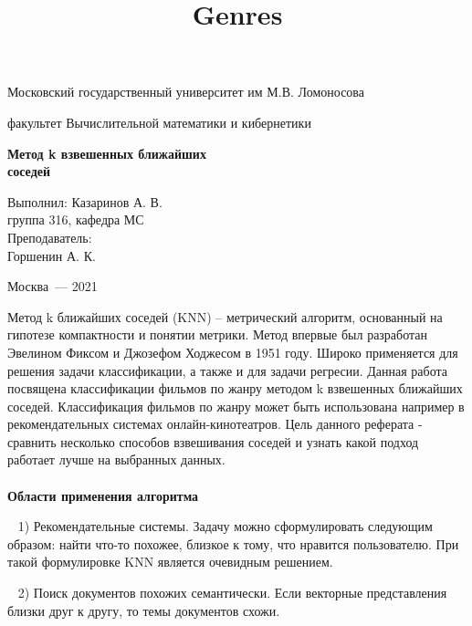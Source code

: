\documentclass[a4paper,titlepage]{article}
\title{Genres}
\begin{document}
\begin{titlepage}
\Large
\centerline{Московский государственный университет им М.В. Ломоносова}
\centerline{факультет Вычислительной математики и кибернетики}
\centerline{\hfill\hrulefill\hrulefill\hfill}
\vfill
\Huge
\begin{centering}
\textbf{Метод k взвешенных ближайших \\ соседей \\}
\end{centering}
\normalsize
\vfill
\begin{flushright}
Выполнил:
Казаринов А. В. \\
группа 316, кафедра МС \\

Преподаватель: \\
Горшенин А. К.
\end{flushright}
\centerline{Москва~--- 2021}
\end{titlepage}

\tableofcontents

\newpage


Метод k ближайших соседей (KNN) – метрический алгоритм, основанный на гипотезе компактности и понятии метрики. Метод впервые был разработан Эвелином Фиксом и Джозефом Ходжесом в 1951 году. Широко применяется для решения задачи классификации, а также и для задачи регресии. Данная работа посвящена классификации фильмов по жанру методом k взвешенных ближайших соседей. Классификация фильмов по жанру может быть использована например в рекомендательных системах онлайн-кинотеатров. Цель данного реферата - сравнить несколько способов взвешивания соседей и узнать какой подход работает лучше на выбранных данных. 
\\
\\
\textbf{Области применения алгоритма}

\par ~ 1) Рекомендательные системы. Задачу можно сформулировать следующим образом: найти что-то похожее, близкое к тому, что нравится пользователю. При такой формулировке KNN является очевидным решением.

\par ~ 2) Поиск документов похожих семантически. Если векторные представления близки друг к другу, то темы документов схожи.
\end{document}
